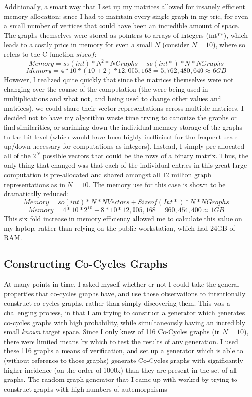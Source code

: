 Additionally, a smart way that I set up my matrices allowed for insanely efficient memory allocation: since I had to maintain every single graph in my trie, for even a small number of vertices that could have been an incredible amount of space.
The graphs themselves were stored as pointers to arrays of integers (int**), which leads to a costly price in memory for even a small $N$ (consider $N=10$), where so refers to the C function $sizeof$:
$$Memory = so(int) * N^2 * NGraphs + so(int*) * N * NGraphs $$
$$Memory = 4 * 10 * (10+2) * 12,005,168 = 5,762,480,640 \approx 6 GB $$
However, I realized quite quickly that since the matrices themselves were not changing over the course of the computation (the were being used in multiplications and what not, and being used to change other values and matrices), we could share their vector representations across multiple matrices.
I decided not to have my algorithm waste time trying to canonize the graphs or find similarities, or shrinking down the individual memory storage of the graphs to the bit level (which would have been highly inefficient for the frequent scale-up/down necessary for computations as integers).
Instead, I simply pre-allocated all of the $2^N$ possible vectors that could be the rows of a binary matrix.
Thus, the only thing that changed was that each of the individual entries in this great large computation is pre-allocated and shared amongst all 12 million graph representations as in $N = 10$.  The memory use for this case is shown to be dramatically reduced:
$$Memory = so(int) * N * NVectors + Sizeof(Int*) * N * NGraphs$$
$$Memory = 4 * 10 * 2^{10} + 8 * 10 * 12,005,168 = 960,454,400 \approx 1 GB $$
This six fold increase in memory efficiency allowed me to calculate this value on my laptop, rather than relying on the public workstation, which had 24GB of RAM.


\subsection{Constructing Co-Cycles Graphs}

At many points in time, I asked myself whether or not I could take the general properties that co-cycles graphs have, and use those observations to intentionally construct co-cycles graphs, rather than simply discovering them.
This was a challenging process, in that I am trying to construct a generator which generates co-cycles graphs with high probability, while simultaneously having an incredibly small \emph{known} target space.
Since I only knew of 116 Co-Cycles graphs (in $N=10$), there were limited means by which to test the results of any generation.
I used these 116 graphs a means of verification, and set up a generator which is able to (without reference to those graphs) generate Co-Cycles graphs with significantly higher incidence (on the order of 1000x) than they are present in the set of all graphs.
The random graph generator that I came up with worked by trying to construct graphs with high numbers of automorphisms.

